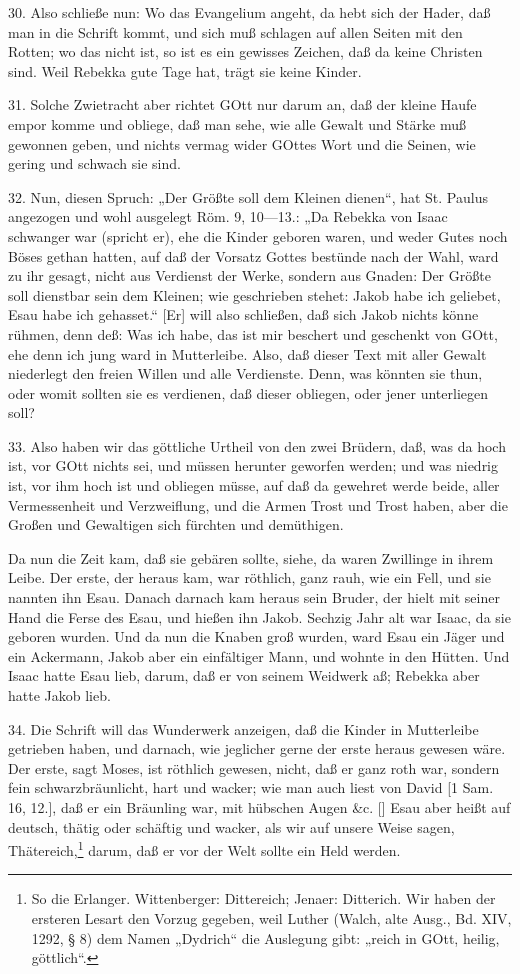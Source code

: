 30. Also schließe nun: Wo das Evangelium angeht, da hebt sich der Hader, daß man in die Schrift kommt, und sich muß schlagen auf allen Seiten mit den Rotten; wo das nicht ist, so ist es ein gewisses Zeichen, daß da keine Christen sind. Weil Rebekka gute Tage hat, trägt sie keine Kinder.

31. Solche Zwietracht aber richtet GOtt nur darum an, daß der kleine Haufe empor komme und obliege, daß man sehe, wie alle Gewalt und Stärke muß gewonnen geben, und nichts vermag wider GOttes Wort und die Seinen, wie gering und schwach sie sind.

32. Nun, diesen Spruch: „Der Größte soll dem Kleinen dienen“, hat St. Paulus angezogen und wohl ausgelegt Röm. 9, 10—13.: „Da Rebekka von Isaac schwanger war (spricht er), ehe die Kinder geboren waren, und weder Gutes noch Böses gethan hatten, auf daß der Vorsatz Gottes bestünde nach der Wahl, ward zu ihr gesagt, nicht aus Verdienst der Werke, sondern aus Gnaden: Der Größte soll dienstbar sein dem Kleinen; wie geschrieben stehet: Jakob habe ich geliebet, Esau habe ich gehasset.“ [Er] will also schließen, daß sich Jakob nichts könne rühmen, denn deß: Was ich habe, das ist mir beschert und geschenkt von GOtt, ehe denn ich jung ward in Mutterleibe. Also, daß dieser Text mit aller Gewalt niederlegt den freien Willen und alle Verdienste. Denn, was könnten sie thun, oder womit sollten sie es verdienen, daß dieser obliegen, oder jener unterliegen soll?

33. Also haben wir das göttliche Urtheil von den zwei Brüdern, daß, was da hoch ist, vor GOtt nichts sei, und müssen herunter geworfen werden; und was niedrig ist, vor ihm hoch ist und obliegen müsse, auf daß da gewehret werde beide, aller Vermessenheit und Verzweiflung, und die Armen Trost und Trost haben, aber die Großen und Gewaltigen sich fürchten und demüthigen.

Da nun die Zeit kam, daß sie gebären sollte, siehe, da waren Zwillinge in ihrem Leibe. Der erste, der heraus kam, war röthlich, ganz rauh, wie ein Fell, und sie nannten ihn Esau. Danach darnach kam heraus sein Bruder, der hielt mit seiner Hand die Ferse des Esau, und hießen ihn Jakob. Sechzig Jahr alt war Isaac, da sie geboren wurden. Und da nun die Knaben groß wurden, ward Esau ein Jäger und ein Ackermann, Jakob aber ein einfältiger Mann, und wohnte in den Hütten. Und Isaac hatte Esau lieb, darum, daß er von seinem Weidwerk aß; Rebekka aber hatte Jakob lieb.

34. Die Schrift will das Wunderwerk anzeigen, daß die Kinder in Mutterleibe getrieben haben, und darnach, wie jeglicher gerne der erste heraus gewesen wäre. Der erste, sagt Moses, ist röthlich gewesen, nicht, daß er ganz roth war, sondern fein schwarzbräunlicht, hart und wacker; wie man auch liest von David [1 Sam. 16, 12.], daß er ein Bräunling war, mit hübschen Augen \&c. [] Esau aber heißt auf deutsch, thätig oder schäftig und wacker, als wir auf unsere Weise sagen, Thätereich,\footnote{So die Erlanger. Wittenberger: Dittereich; Jenaer: Ditterich. Wir haben der ersteren Lesart den Vorzug gegeben, weil Luther (Walch, alte Ausg., Bd. XIV, 1292, § 8) dem Namen „Dydrich“ die Auslegung gibt: „reich in GOtt, heilig, göttlich“.} darum, daß er vor der Welt sollte ein Held werden.


